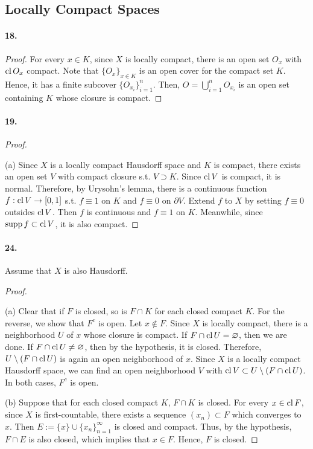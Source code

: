 \subsection{Locally Compact Spaces}
\paragraph{18.}
\begin{proof}
  For every $x \in K$, since $X$ is locally compact, there is an open set 
  $O_x$ with $\operatorname{cl} O_x$ compact. Note that $\{O_x\}_{x\in K}$ is an open cover
  for the compact set $K$. Hence, it has a finite subcover
  $\{O_{x_i}\}_{i=1}^n$. Then, $O = \bigcup_{i=1}^n O_{x_i}$ is an open set
  containing $K$ whose closure is compact. 
\end{proof}

\paragraph{19.}
\begin{proof}
  $\,$\par
  (a) Since $X$ is a locally compact Hausdorff space and $K$ is compact, there
  exists an open set $V$ with compact closure s.t. $V\supset K$. Since 
  $\operatorname{cl} V$ is compact, it is normal. Therefore, by Urysohn's lemma, there is
  a continuous function $f: \operatorname{cl} V \to [0, 1]$ s.t. $f\equiv 1$ on $K$ and
  $f\equiv 0$ on $\partial V$. Extend $f$ to $X$ by setting $f \equiv 0$
  outsides $\operatorname{cl} V$. Then $f$ is continuous and $f \equiv 1$ on $K$. Meanwhile,
  since $\operatorname{supp} f\subset \operatorname{cl} V$, it is also compact.
\end{proof}

\paragraph{24.}
  Assume that $X$ is also Hausdorff.
\begin{proof}
  $\,$\par
  (a) Clear that if $F$ is closed, so is $F\cap K$ for each closed compact
  $K$. For the reverse, we show that $F^c$ is open.
  Let $x \notin F$. Since $X$ is locally compact, there is a neighborhood $U$
  of $x$ whose closure is compact. If $F\cap\operatorname{cl} U = \varnothing$, then we are
  done. If $F\cap \operatorname{cl} U \ne \varnothing$, then by the hypothesis, it is closed.
  Therefore, $U\setminus(F\cap\operatorname{cl} U)$ is again an open neighborhood of $x$.
  Since $X$ is a locally compact Hausdorff space, we can find an open
  neighborhood $V$ with $\operatorname{cl} V \subset U\setminus(F\cap\operatorname{cl} U)$. In both cases,
  $F^c$ is open. 
  
  (b) Suppose that for each closed compact $K$, $F\cap K$ is closed. For every
  $x \in \operatorname{cl} F$, since $X$ is first-countable, there exists a sequence $(x_n)
  \subset F$ which converges to $x$. Then $E := \{x\}\cup\{x_n\}_{n=1}^\infty$
  is closed and compact. Thus, by the hypothesis, $F\cap E$ is also closed,
  which implies that $x \in F$. Hence, $F$ is closed. 
\end{proof}

